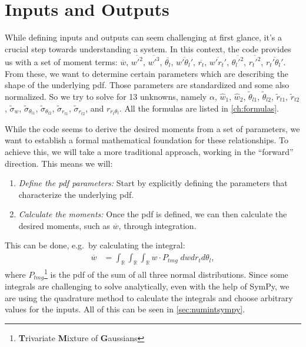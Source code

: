 \section{Inputs and Outputs}\label{sec:inputsandoutputs}

While defining inputs and outputs can seem challenging at first glance, it's a crucial step towards understanding a system.
In this context, the code provides us with a set of moment terms: $\overline{w}$, $\overline{w'^2}$, $\overline{w'^3}$, $\overline{\theta_l}$, $\overline{w'\theta_l'}$, $\overline{r_t}$, $\overline{w' r_t'}$, $\overline{\theta_l'^2}$, $\overline{r_t'^2}$, $\overline{r_t'\theta_l'}$.
From these, we want to determine certain parameters which are describing the shape of the underlying \gls{pdf}.
Those parameters are standardized and some also normalized.
So we try to solve for 13 unknowns, namely $\alpha$, $\widehat{w}_1$, $\widehat{w}_2$, $\tilde{\theta}_{l1}$, $\tilde{\theta}_{l2}$, $\tilde{r}_{t1}$, $\tilde{r}_{t2}$, $\tilde{\sigma}_w$, $\tilde{\sigma}_{\theta_{l1}}$, $\tilde{\sigma}_{\theta_{l2}}$, $\tilde{\sigma}_{r_{t1}}$, $\tilde{\sigma}_{r_{t2}}$, and $r_{r_t \theta_l}$.
All the formulas are listed in \cref{ch:formulas}.

While the code seems to derive the desired moments from a set of parameters, we want to establish a formal mathematical foundation for these relationships.
To achieve this, we will take a more traditional approach, working in the \enquote{forward} direction.
This means we will:
\begin{enumerate}
    \item \emph{Define the \gls{pdf} parameters:}
    Start by explicitly defining the parameters that characterize the underlying \gls{pdf}.
    \item \emph{Calculate the moments:}
    Once the \gls{pdf} is defined, we can then calculate the desired moments, such as $\overline{w}$, through integration.
\end{enumerate}
This can be done, e.g.\ by calculating the integral:
\begin{align}
    \overline{w}
    &= \int_{\mathbb{R}} \int_{\mathbb{R}} \int_{\mathbb{R}} w \cdot P_{tmg} \; dw dr_t d\theta_l,
\end{align}
where $P_{tmg}$\footnote{\textbf{T}rivariate \textbf{M}ixture of \textbf{G}aussians} is the \gls{pdf} of the sum of all three normal distributions.
Since some integrals are challenging to solve analytically, even with the help of SymPy, we are using the quadrature method to calculate the integrals and choose arbitrary values for the inputs.
All of this can be seen in \cref{sec:numintsympy}.
